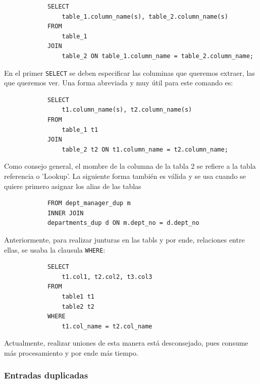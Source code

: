         \begin{verbatim}
            SELECT
                table_1.column_name(s), table_2.column_name(s)
            FROM
                table_1
            JOIN
                table_2 ON table_1.column_name = table_2.column_name;
        \end{verbatim}

        En el primer \texttt{SELECT} se deben especificar las columinas que queremos extraer, las que queremos ver. Una forma abreviada y muy útil para este comando es:

        \begin{verbatim}
            SELECT
                t1.column_name(s), t2.column_name(s)
            FROM
                table_1 t1
            JOIN
                table_2 t2 ON t1.column_name = t2.column_name;
        \end{verbatim}

        Como consejo general, el mombre de la columna de la tabla 2 se refiere a la tabla referencia o 'Lookup'. La siguiente forma también es válida y se usa cuando se quiere primero asignar los alias de las tablas

        \begin{verbatim}
            FROM dept_manager_dup m
            INNER JOIN 
            departments_dup d ON m.dept_no = d.dept_no
        \end{verbatim}

        Anteriormente, para realizar junturas en las tabls y por ende, relaciones entre ellas, se usaba la clausula \texttt{WHERE}:

        \begin{verbatim}
            SELECT
                t1.col1, t2.col2, t3.col3
            FROM
                table1 t1
                table2 t2
            WHERE
                t1.col_name = t2.col_name
        \end{verbatim}

        Actualmente, realizar uniones de esta manera está desconsejado, pues consume más procesamiento y por ende más tiempo.

        \subsubsection{Entradas duplicadas}

